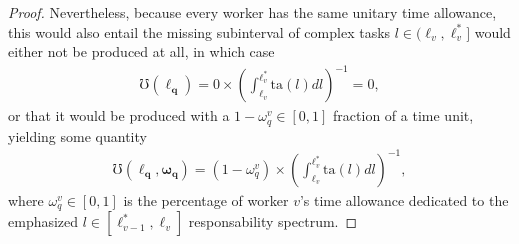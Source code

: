\documentclass[hidelinks, nonatbib]{elsarticle}
\begin{document}
\begin{lemma}
\begin{proof}
        Nevertheless, because every worker has the same unitary time allowance, this would also entail the missing subinterval of complex tasks $l \in (\ell_{v}, \ell_{v}^{*}]$ would either not be produced at all, in which case
        \begin{align}
            \mho(\boldsymbol{\ell_{q}})
            =
            0
            \times
            \left(
                \int_{
                    \ell_{v}
                }^{
                    \ell_{v}^{*}
                }
                \text{ta}(l)dl
            \right) ^ {-1}
            =
            0
            ,
        \end{align}
        or that it would be produced with a $1 - \omega_{q}^{v} \in [0,1]$ fraction of a time unit, yielding some quantity
        \begin{align}
            \mho(
                \boldsymbol{\ell_{q}}
                ,\boldsymbol{\omega_{q}}
            )
            =
            (1 - \omega_{q}^{v})
            \times
            \left(
                \int_{
                    \ell_{v}
                }^{
                    \ell_{v}^{*}
                }
                \text{ta}(l)dl
            \right) ^ {-1}
            ,
        \end{align}
        where $\omega_{q}^{v} \in [0,1]$ is the percentage of worker $v$'s time allowance dedicated to the emphasized $l \in [\ell_{v-1}^{*}, \ell_{v}]$ responsability spectrum.
        

\end{proof}
\end{lemma}
\end{document}
